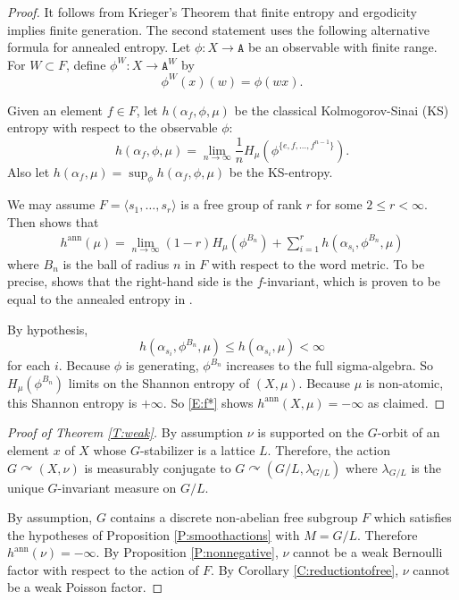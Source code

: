 \documentclass[11pt]{amsart}
\theoremstyle{definition}
\theoremstyle{remark}
\newcommand{\ann}{\operatorname{ann}}
\def\cc{{\curvearrowright}}
\begin{document}
\begin{proof}


It follows from Krieger's Theorem \cite{MR259068} that finite entropy and ergodicity implies finite generation. The second statement uses the following alternative formula for annealed entropy. Let $\phi:X \to \mathtt{A}$ be an observable with finite range. For $W \subset F$, define $\phi^W:X \to \mathtt{A}^W$ by
$$\phi^W(x)(w)=\phi(wx).$$

Given an element $f\in F$, let $h(\alpha_f,\phi,\mu)$ be the classical Kolmogorov-Sinai (KS) entropy with respect to the observable $\phi$:
$$h(\alpha_f,\phi,\mu)=\lim_{n\to\infty} \frac{1}{n} H_\mu\left(\phi^{\{e,f,\ldots, f^{n-1}\}}\right).$$
Also let $h(\alpha_f,\mu) = \sup_\phi h(\alpha_f,\phi,\mu) $ be the KS-entropy. 

We may assume $F=\langle s_1,\ldots, s_r\rangle$ is a free group of rank $r$ for some $2\le r < \infty$. Then \cite[Theorem 9.1]{MR2736889}
 shows that
 \begin{align}\label{E:f*}
     h^{\ann}(\mu)=\lim_{n\to\infty} (1-r) H_\mu(\phi^{B_n})+\sum_{i=1}^r h(\alpha_{s_i},\phi^{B_n},\mu)
 \end{align}
where $B_n$ is the ball of radius $n$ in $F$ with respect to the word metric. To be precise, \cite{MR2736889} shows that the right-hand side is the $f$-invariant, which is proven to be equal to the annealed entropy in \cite{MR2653969}.

By hypothesis, 
$$h(\alpha_{s_i},\phi^{B_n},\mu) \le h(\alpha_{s_i},\mu)<\infty$$
for each $i$. Because $\phi$ is generating, $\phi^{B_n}$ increases to the full sigma-algebra. So $H_\mu(\phi^{B_n})$ limits on 
the Shannon entropy of $(X,\mu)$. Because $\mu$ is non-atomic, this Shannon entropy is $+\infty$. So \eqref{E:f*} shows $h^{\ann}(X,\mu)=-\infty$ as claimed.
\end{proof}



\begin{proof}[Proof of Theorem \ref{T:weak}]
By assumption $\nu$ is supported on the $G$-orbit of an element $x$ of $X$ whose $G$-stabilizer is a lattice $L$. Therefore, the action $G \cc (X,\nu)$ is measurably conjugate to $G \cc (G/L, \lambda_{G/L})$ where $\lambda_{G/L}$ is the unique $G$-invariant measure on $G/L$.

By assumption, $G$ contains a discrete non-abelian free subgroup $F$ which satisfies the hypotheses of Proposition \ref{P:smoothactions} with $M=G/L$. Therefore $h^{\ann}(\nu)=-\infty$.  By Proposition \ref{P:nonnegative}, $\nu$ cannot be a weak Bernoulli factor with respect to the action of $F$. By Corollary \ref{C:reductiontofree}, $\nu$ cannot be a weak Poisson factor.

\end{proof}
\end{document}
